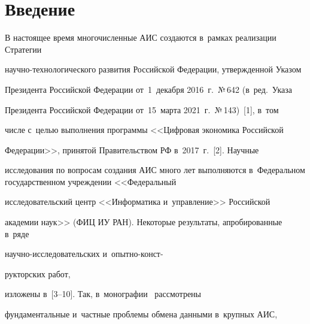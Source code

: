  \thispagestyle{headings}


 


 \vspace*{-23pt}





\section{Введение}





\vspace*{-6pt}





  В настоящее время многочисленные АИС создаются в~рамках реализации Стратегии 


  на\-уч\-но-тех\-но\-ло\-ги\-че\-ско\-го развития Российской Федерации, утверж\-ден\-ной Указом 


Президента Российской Федерации от~1~декабря 2016~г.\ №\,642 (в~ред.\ Указа 


Президента Российской Федерации от~15~марта 2021~г.\ №\,143)~[1], в~том 


числе с~целью выполнения программы <<Цифровая экономика Российской 


Федерации>>, принятой Правительством РФ в~2017~г.~[2]. Научные 


исследования по вопросам создания АИС много лет выполняются в~Федеральном государственном учреждении <<Федеральный 


исследовательский центр <<Информатика и~управ\-ле\-ние>> Российской 


академии наук>> (ФИЦ ИУ РАН). Некоторые результаты, апробированные в~ряде  


на\-уч\-но-ис\-сле\-до\-ва\-тель\-ских и~опыт\-но-конст-\linebreak\vspace*{-12pt}





\pagebreak





\noindent


рук\-тор\-ских работ, 


изложены в~[3--10]. Так, в~монографии~\cite{4-ger} рассмотрены 


фундаментальные и~частные проблемы обмена данными в~крупных АИС, 


